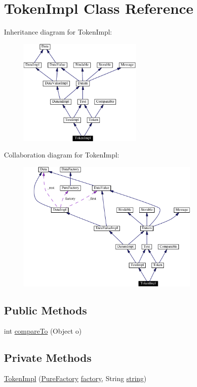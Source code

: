 \hypertarget{classTokenImpl}{
\section{Token\-Impl  Class Reference}
\label{classTokenImpl}
}
Inheritance diagram for Token\-Impl:\begin{figure}[H]
\begin{center}
\leavevmode
\includegraphics[width=170pt]{classTokenImpl__inherit__graph}
\end{center}
\end{figure}
Collaboration diagram for Token\-Impl:\begin{figure}[H]
\begin{center}
\leavevmode
\includegraphics[width=253pt]{classTokenImpl__coll__graph}
\end{center}
\end{figure}
\subsection*{Public Methods}
\begin{CompactItemize}
\item 
int \hyperlink{classTokenImpl_a0}{compare\-To} (Object o)
\end{CompactItemize}
\subsection*{Private Methods}
\begin{CompactItemize}
\item 
\hyperlink{classTokenImpl_c0}{Token\-Impl} (\hyperlink{classPureFactory}{Pure\-Factory} \hyperlink{classDataImpl_o0}{factory}, String \hyperlink{classTextImpl_o0}{string})
\end{CompactItemize}


